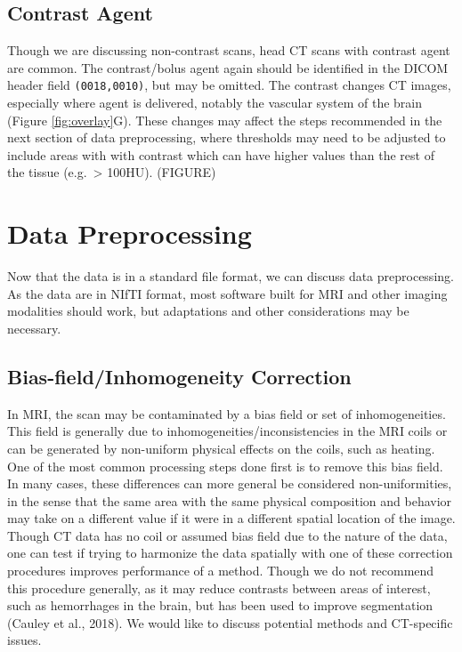 \documentclass[utf8]{frontiersSCNS}
\begin{document}
\hypertarget{contrast-agent}{%
\subsection{Contrast Agent}\label{contrast-agent}}

Though we are discussing non-contrast scans, head CT scans with contrast agent are common. The contrast/bolus agent again should be identified in the DICOM header field \texttt{(0018,0010)}, but may be omitted. The contrast changes CT images, especially where agent is delivered, notably the vascular system of the brain (Figure \ref{fig:overlay}G). These changes may affect the steps recommended in the next section of data preprocessing, where thresholds may need to be adjusted to include areas with with contrast which can have higher values than the rest of the tissue (e.g.~\textgreater{} 100HU). (FIGURE)

\hypertarget{data-preprocessing}{%
\section{Data Preprocessing}\label{data-preprocessing}}

Now that the data is in a standard file format, we can discuss data preprocessing. As the data are in NIfTI format, most software built for MRI and other imaging modalities should work, but adaptations and other considerations may be necessary.

\hypertarget{bias-fieldinhomogeneity-correction}{%
\subsection{Bias-field/Inhomogeneity Correction}\label{bias-fieldinhomogeneity-correction}}

In MRI, the scan may be contaminated by a bias field or set of inhomogeneities. This field is generally due to inhomogeneities/inconsistencies in the MRI coils or can be generated by non-uniform physical effects on the coils, such as heating. One of the most common processing steps done first is to remove this bias field. In many cases, these differences can more general be considered non-uniformities, in the sense that the same area with the same physical composition and behavior may take on a different value if it were in a different spatial location of the image. Though CT data has no coil or assumed bias field due to the nature of the data, one can test if trying to harmonize the data spatially with one of these correction procedures improves performance of a method. Though we do not recommend this procedure generally, as it may reduce contrasts between areas of interest, such as hemorrhages in the brain, but has been used to improve segmentation (Cauley et al., 2018). We would like to discuss potential methods and CT-specific issues.
\end{document}
